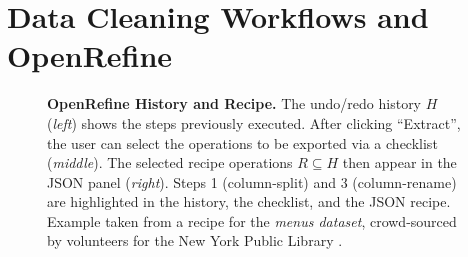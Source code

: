 \documentclass[conference]{ijdc-v14}
\newcommand{\openrefine}{\textrm{OpenRefine}\xspace}
\newcommand{\co}[1]{\textsf{\small{#1}}}
\begin{document}


\section{Data Cleaning Workflows and  \openrefine}


\begin{figure}[t]
\centering
{}
\caption{\textbf{\openrefine History and Recipe.} The {undo/redo} history $H$
(\emph{left}) shows the steps previously executed.  After clicking ``\co{Extract}'', the user can select the operations to
 be exported via a checklist (\emph{middle}). The selected recipe operations $R\subseteq H$ then appear in the JSON panel
 (\emph{right}). Steps 1 (\co{column-split}) and 3 (\co{column-rename}) are highlighted in the history, the checklist, and the JSON recipe. 
 Example taken from a recipe for the \emph{menus dataset}, crowd-sourced
 by volunteers for the New York Public Library \cite {whatsonmenu}.}
\label{fig:recipe}
\end{figure}
\end{document}

